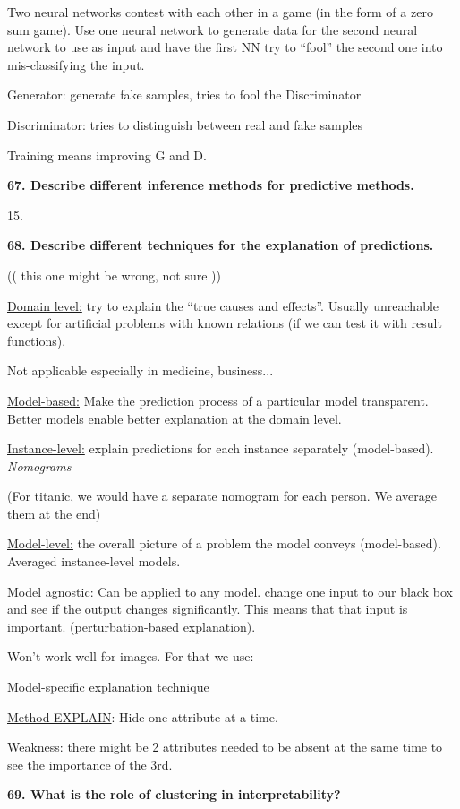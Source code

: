 Two neural networks contest with each other in a game (in the form of a
zero sum game). Use one neural network to generate data for the second
neural network to use as input and have the first NN try to ``fool'' the
second one into mis-classifying the input.

Generator: generate fake samples, tries to fool the Discriminator

Discriminator: tries to distinguish between real and fake samples

Training means improving G and D.

\textbf{67. Describe different inference methods for predictive
methods.}

15.

\textbf{68. Describe different techniques for the explanation of
predictions.}

(( this one might be wrong, not sure ))

\underline{Domain level:} try to explain the ``true causes and
effects''. Usually unreachable except for artificial problems with known
relations (if we can test it with result functions).

Not applicable especially in medicine, business...

\underline{Model-based:} Make the prediction process of a particular
model transparent. Better models enable better explanation at the domain
level.

\underline{Instance-level:} explain predictions for each instance
separately (model-based). \emph{Nomograms}

(For titanic, we would have a separate nomogram for each person. We
average them at the end)

\underline{Model-level:} the overall picture of a problem the model
conveys (model-based). Averaged instance-level models.

\underline{Model agnostic:} Can be applied to any model. change one
input to our black box and see if the output changes significantly. This
means that that input is important. (perturbation-based explanation).

Won't work well for images. For that we use:

\underline{Model-specific explanation technique}

\underline{Method EXPLAIN}: Hide one attribute at a time.

Weakness: there might be 2 attributes needed to be absent at the same
time to see the importance of the 3rd.

\textbf{69. What is the role of clustering in interpretability?}

